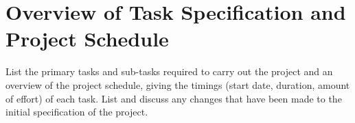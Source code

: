 \section{Overview of Task Specification and Project Schedule}
List the primary tasks and sub-tasks required to carry out the project and an
overview of the project schedule, giving the timings (start date, duration,
amount of effort) of each task. List and discuss any changes that have been made
to the initial specification of the project. 